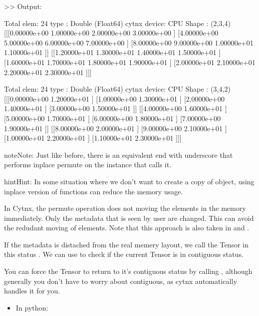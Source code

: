 \documentclass[letterpaper,10pt,english]{sphinxmanual}
\begin{document}
\textgreater{}\textgreater{} Output:

\begin{sphinxVerbatim}[commandchars=\\\{\}]
Total elem: 24
type  : Double (Float64)
cytnx device: CPU
Shape : (2,3,4)
[[[0.00000e+00 1.00000e+00 2.00000e+00 3.00000e+00 ]
  [4.00000e+00 5.00000e+00 6.00000e+00 7.00000e+00 ]
  [8.00000e+00 9.00000e+00 1.00000e+01 1.10000e+01 ]]
 [[1.20000e+01 1.30000e+01 1.40000e+01 1.50000e+01 ]
  [1.60000e+01 1.70000e+01 1.80000e+01 1.90000e+01 ]
  [2.00000e+01 2.10000e+01 2.20000e+01 2.30000e+01 ]]]

Total elem: 24
type  : Double (Float64)
cytnx device: CPU
Shape : (3,4,2)
[[[0.00000e+00 1.20000e+01 ]
  [1.00000e+00 1.30000e+01 ]
  [2.00000e+00 1.40000e+01 ]
  [3.00000e+00 1.50000e+01 ]]
 [[4.00000e+00 1.60000e+01 ]
  [5.00000e+00 1.70000e+01 ]
  [6.00000e+00 1.80000e+01 ]
  [7.00000e+00 1.90000e+01 ]]
 [[8.00000e+00 2.00000e+01 ]
  [9.00000e+00 2.10000e+01 ]
  [1.00000e+01 2.20000e+01 ]
  [1.10000e+01 2.30000e+01 ]]]
\end{sphinxVerbatim}

\begin{sphinxadmonition}{note}{Note:}
Just like before, there is an equivalent  end with underscore that performs inplace permute on the instance that calls it.
\end{sphinxadmonition}

\begin{sphinxadmonition}{hint}{Hint:}
In some situation where we don’t want to create a copy of object, using inplace version of functions can reduce the memory usage.
\end{sphinxadmonition}

In Cytnx, the permute operation does not moving the elements in the memory immediately. Only the meta\sphinxhyphen{}data that is seen by user are changed.
This can avoid the redudant moving of elements. Note that this approach is also taken in  and  .

If the meta\sphinxhyphen{}data is distached from the real memery layout, we call the Tensor in this status . We can use  to check if the current Tensor is in contiguous status.

You can force the Tensor to return to it’s contiguous status by calling , although generally you don’t have to worry about contiguous, as cytnx automatically handles it for you.
\begin{itemize}
\item {} 
In python:

\end{itemize}
\end{document}

